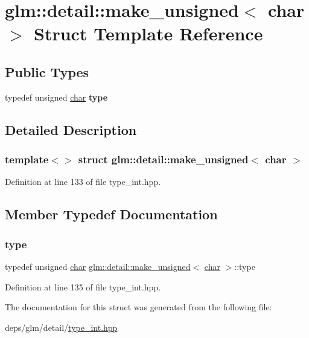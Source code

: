\hypertarget{structglm_1_1detail_1_1make__unsigned_3_01char_01_4}{}\section{glm\+:\+:detail\+:\+:make\+\_\+unsigned$<$ char $>$ Struct Template Reference}
\label{structglm_1_1detail_1_1make__unsigned_3_01char_01_4}
\subsection*{Public Types}
\begin{DoxyCompactItemize}
\item 
\mbox{\label{structglm_1_1detail_1_1make__unsigned_3_01char_01_4_a473f89289be25f14bdc7c459e4be4fed}} 
typedef unsigned \hyperlink{classchar}{char} {\bfseries type}
\end{DoxyCompactItemize}


\subsection{Detailed Description}
\subsubsection*{template$<$$>$\newline
struct glm\+::detail\+::make\+\_\+unsigned$<$ char $>$}



Definition at line 133 of file type\+\_\+int.\+hpp.



\subsection{Member Typedef Documentation}
\mbox{\label{structglm_1_1detail_1_1make__unsigned_3_01char_01_4_a473f89289be25f14bdc7c459e4be4fed}} 
\subsubsection{\texorpdfstring{type}{type}}
{\footnotesize\ttfamily typedef unsigned \hyperlink{classchar}{char} \hyperlink{structglm_1_1detail_1_1make__unsigned}{glm\+::detail\+::make\+\_\+unsigned}$<$ \hyperlink{classchar}{char} $>$\+::type}



Definition at line 135 of file type\+\_\+int.\+hpp.



The documentation for this struct was generated from the following file\+:\begin{DoxyCompactItemize}
\item 
deps/glm/detail/\hyperlink{type__int_8hpp}{type\+\_\+int.\+hpp}\end{DoxyCompactItemize}
